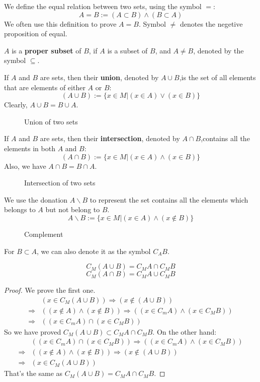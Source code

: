 We define the equal relation between two sets, using the symbol $=$:
\[A=B :=(A\subset B)\wedge(B\subset A)\]
We often use this definition to prove $A=B$.
Symbol $\neq$ denotes the negetive proposition of equal.

$A$ is a \textbf{proper subset} of $B$, if $A$ is a subset of $B$, and $A\neq B$, denoted by the symbol $\subseteq $.

If $A$ and $B$ are sets, then their \textbf{union}, denoted by $A \cup  B$,is the set of all elements that are elements of either $A$ or $B$:
\[(A\cup B):=\{x\in M|(x\in A)\vee (x\in B)\}\]
Clearly, $A\cup B=B\cup A$.
\begin{figure}
    \centering
    \caption{Union of two sets}
    
\end{figure}

If $A$ and $B$ are sets, then their \textbf{intersection}, denoted by $A \cap  B$,contains all the elements in both $A$ and $B$:
\[(A\cap B):=\{x\in M|(x\in A)\wedge (x\in B)\}\]
Also, we have $A\cap B=B\cap A$.
\begin{figure}[h] 
    \centering
    \caption{Intersection of two sets}
    
\end{figure}

We use the donation $A\backslash B$ to represent the set contains all the elements which belongs to $A$ but not belong to $B$.
\[A\backslash B:=\{x\in M|(x\in A)\wedge(x\not\in B)\}\]
\begin{figure}[ht]
    \centering
    \caption{Complement}
    
\end{figure}

For $B\subset A$, we can also denote it as the symbol $C_{A}B$.

\begin{question}[de Morgen]
    \[C_{M}(A\cup B)=C_{M}A\cap C_{M}B\]
    \[C_{M}(A\cap B)=C_{M}A\cup C_{M}B\]
\end{question}
\begin{proof}We prove the first one.
    \[
    \begin{aligned}
        &(x\in C_{M}(A\cup B))\Rightarrow (x \not\in (A\cup B))\\ \Rightarrow& ((x\not\in A)\wedge(x\not\in B))
        \Rightarrow((x\in C_{m}A)\wedge(x\in C_{M}B))\\ \Rightarrow&((x\in C_{m}A)\cap(x\in C_{M}B))
    \end{aligned}\]
    So we have proved $C_{M}(A\cup B)\subset C_{M}A\cap C_{M}B$. On the other hand:
    \[\begin{aligned}
        &((x\in C_{m}A)\cap(x\in C_{M}B))\Rightarrow ((x\in C_{m}A)\wedge(x\in C_{M}B))\\ \Rightarrow& ((x\not\in A)\wedge(x\not\in B))\Rightarrow (x \not\in (A\cup B))\\ \Rightarrow&(x\in C_{M}(A\cup B))
    \end{aligned}\]
    That's the same as $C_{M}(A\cup B)=C_{M}A\cap C_{M}B$.
\end{proof}

